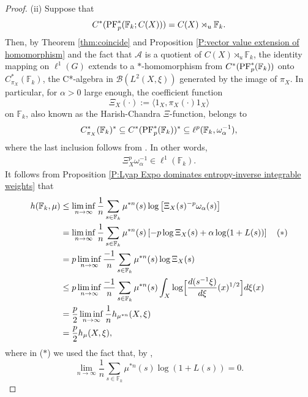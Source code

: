 \documentclass[12pt]{amsart}
\theoremstyle{definition}
\theoremstyle{remark}
\numberwithin{equation}{section}
\newcommand{\F}{\mathbb{F}}
\newcommand{\om}{\omega}
\newcommand{\la}{\langle}
\newcommand{\ra}{\rangle}
\begin{document}
\begin{proof}
(ii) Suppose that
$$C^*(\textup{PF}^*_p(\F_k;C(X))) = C(X)\rtimes_u \F_k.$$ Then, by Theorem \ref{thm:coincide} and Proposition \ref{P:vector value extension of homomorphism} and the fact that $\mathcal{A}$ is a quotient of $C(X)\rtimes_u \F_k$, the identity mapping on $\ell^1(G)$
extends to a $*$-homomorphism from $C^*(\textup{PF}^*_p(\F_k))$ onto $C^*_{\pi_X}(\F_k)$, the C*-algebra in $\mathcal{B}(L^2(X,\xi))$ generated by the image of $\pi_X$. In particular, for $\alpha>0$ large enough, the coefficient function 
$$\Xi_X(\cdot):=\la 1_X, \pi_X(\cdot) 1_X\ra$$ on $\F_k$, also known as the Harish-Chandra $\Xi$-function, belongs to
$$C^*_{\pi_X}(\F_k)^*\subseteq C^*(\textup{PF}^*_p(\F_k))^* \subseteq \ell^p(\F_k,\om_\alpha^{-1}),$$ where the last inclusion follows from \cite[Theorem 5.11]{SW2}. In other words,
\begin{align*}
    \Xi_X^p \om_\alpha^{-1}\in \ell^1(\F_k).
\end{align*}
It follows from Proposition \ref{P:Lyap Expo dominates entropy-inverse integrable weights} that 
\begin{align*}%
h(\F_k,\mu)& \leq \liminf_{n\rightarrow \infty}\dfrac{1}{n}\sum_{s\in \F_k}\mu^{*n}(s)\log \left[\Xi_X(s)^{-p}\omega_\alpha(s)\right] \\
& = \liminf_{n\rightarrow \infty}\dfrac{1}{n}\sum_{s\in \F_k}\mu^{*n}(s)\left[-p\log \Xi_X(s)+\alpha \log (1+L(s))\right] \ \ \ (*)
\\
& = p\liminf_{n\rightarrow \infty}\dfrac{-1}{n}\sum_{s\in \F_k}\mu^{*n}(s)\log \Xi_X(s) \\
& \leq p\liminf_{n\rightarrow \infty}\dfrac{-1}{n}\sum_{s\in \F_k} \mu^{*n}(s)\int_X  \log\Bigl[ \frac{d(s^{-1}  \xi)}{d\xi}(x)^{1/2}\Bigr] d\xi(x) \\
&=\frac{p}{2}\liminf_{n\rightarrow \infty}\dfrac{1}{n} h_{\mu^{*n}}(X,\xi) \\
& = \frac{p}{2} h_\mu(X,\xi),
\end{align*}
where in ($*$) we used the fact that, by \cite[Theorem 3.7]{ASdLSS1}, 
$$ \lim_{n\rightarrow \infty}\dfrac{1}{n}\sum_{s\in \F_k} \mu^{*n}(s) \log (1+L(s))=0.$$

\end{proof}
\end{document}
